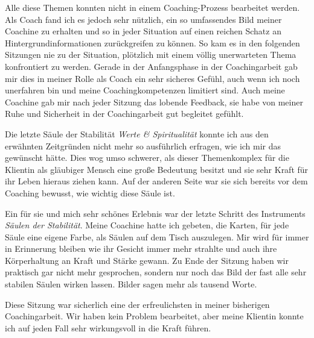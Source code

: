 \documentclass[11pt,a4paper]{article}
\begin{document}
Alle diese Themen konnten nicht in einem Coaching-Prozess bearbeitet werden. Als Coach fand ich es jedoch sehr nützlich, ein so umfassendes Bild meiner Coachine zu erhalten und so in jeder Situation auf einen reichen Schatz an Hintergrundinformationen zurückgreifen zu können. So kam es in den folgenden Sitzungen nie zu der Situation, plötzlich mit einem völlig unerwarteten Thema konfrontiert zu werden. Gerade in der Anfangsphase in der Coachingarbeit gab mir dies in meiner Rolle als Coach ein sehr sicheres Gefühl, auch wenn ich noch unerfahren bin und meine Coachingkompetenzen limitiert sind. Auch meine Coachine gab mir nach jeder Sitzung das lobende Feedback, sie habe von meiner Ruhe und Sicherheit in der Coachingarbeit gut begleitet gefühlt.

Die letzte Säule der Stabilität \textsl{Werte \& Spiritualität} konnte ich aus den erwähnten Zeitgründen nicht mehr so ausführlich erfragen, wie ich mir das gewünscht hätte. Dies wog umso schwerer, als dieser Themenkomplex für die Klientin als gläubiger Mensch eine große Bedeutung besitzt und sie sehr Kraft für ihr Leben hieraus ziehen kann. Auf der anderen Seite war sie sich bereits vor dem Coaching bewusst, wie wichtig diese Säule ist. 

Ein für sie und mich sehr schönes Erlebnis war der letzte Schritt des Instruments \textsl{Säulen der Stabilität}. Meine Coachine hatte ich gebeten, die Karten, für jede Säule eine eigene Farbe, als Säulen auf dem Tisch auszulegen. Mir wird für immer in Erinnerung bleiben wie ihr Gesicht immer mehr strahlte und auch ihre Körperhaltung an Kraft und Stärke gewann. Zu Ende der Sitzung haben wir praktisch gar nicht mehr gesprochen, sondern nur noch das Bild der fast alle sehr stabilen Säulen wirken lassen. Bilder sagen mehr als tausend Worte.

Diese Sitzung war sicherlich eine der erfreulichsten in meiner bisherigen Coachingarbeit. Wir haben kein Problem bearbeitet, aber meine Klientin konnte ich auf jeden Fall sehr wirkungsvoll in die Kraft führen.



\subsection*{\color{Orange}{Zweite Sitzung: Achsen der Stärke}}



\subsection*{\color{Orange}{Dritte Sitzung: Trichtern mit Fragen für die Überprüfung der Ziele}}
\end{document}
